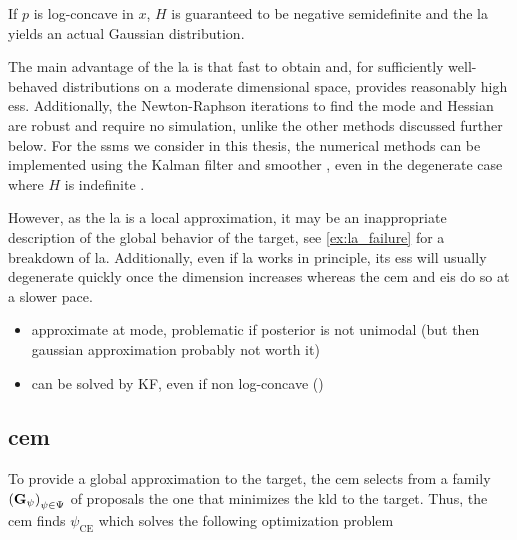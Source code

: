 If $p$ is log-concave in $x$, $H$ is guaranteed to be negative semidefinite and the \gls{la} yields an actual Gaussian distribution. 


The main advantage of the \gls{la} is that fast to obtain and, for sufficiently well-behaved distributions on a moderate dimensional space, provides reasonably high \gls{ess}. Additionally, the Newton-Raphson iterations to find the mode and Hessian are robust and require no simulation, unlike the other methods discussed further below.
For the \glspl{ssm} we consider in this thesis, the numerical methods can be implemented using the Kalman filter and smoother \cite{Shephard1997Likelihood,Durbin1997Monte}, even in the degenerate case where $H$ is indefinite \cite{Jungbacker2007Monte}.

However, as the \gls{la} is a local approximation, it may be an inappropriate description of the global behavior of the target, see \cref{ex:la_failure} for a breakdown of \gls{la}. 
Additionally, even if \gls{la} works in principle, its \gls{ess} will usually degenerate quickly once the dimension increases whereas the \gls{cem} and \gls{eis} do so at a slower pace.

\begin{itemize}
    \item approximate at mode, problematic if posterior is not unimodal (but then gaussian approximation probably not worth it)
    \item can be solved by KF, even if non log-concave ()
\end{itemize}

\subsection{\texorpdfstring{\Acrfull{cem}}{Cross-entropy method}}
To provide a global approximation to the target, the \gls{cem}\cite{Rubinstein1999CrossEntropy,Rubinstein2004CrossEntropy} selects from a family $ \left( \mathbf G_{\psi} \right)_{\psi \in \Psi}$ of proposals the one that minimizes the \gls{kld} to the target. Thus, the \gls{cem} finds $\psi_{\text{CE}}$ which solves the following optimization problem

